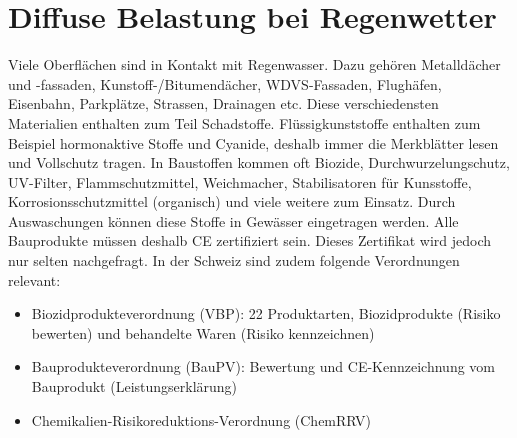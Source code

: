 \documentclass[9pt, openright=false]{scrartcl}
\begin{document}
\section{Diffuse Belastung bei Regenwetter}
Viele Oberflächen sind in Kontakt mit Regenwasser. Dazu gehören Metalldächer und -fassaden, Kunstoff-/Bitumendächer, WDVS-Fassaden, Flughäfen, Eisenbahn, Parkplätze, Strassen, Drainagen etc. Diese verschiedensten Materialien enthalten zum Teil Schadstoffe. Flüssigkunststoffe enthalten zum Beispiel hormonaktive Stoffe und Cyanide, deshalb immer die Merkblätter lesen und Vollschutz tragen. In Baustoffen kommen oft Biozide, Durchwurzelungschutz, UV-Filter, Flammschutzmittel, Weichmacher, Stabilisatoren für Kunsstoffe, Korrosionsschutzmittel (organisch) und viele weitere zum Einsatz. Durch Auswaschungen können diese Stoffe in Gewässer eingetragen werden. Alle Bauprodukte müssen deshalb CE zertifiziert sein. Dieses Zertifikat wird jedoch nur selten nachgefragt. In der Schweiz sind zudem folgende Verordnungen relevant:
\begin{itemize}
\item Biozidprodukteverordnung (VBP): 22 Produktarten, Biozidprodukte (Risiko bewerten) und behandelte Waren (Risiko kennzeichnen)
\item Bauprodukteverordnung (BauPV): Bewertung und CE-Kennzeichnung vom Bauprodukt (Leistungserklärung)
\item Chemikalien-Risikoreduktions-Verordnung (ChemRRV)
\end{itemize}
\end{document}
